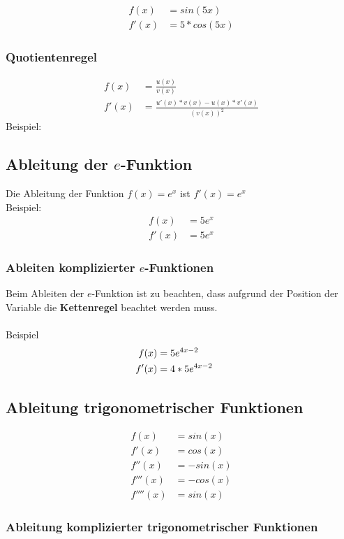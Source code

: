 \documentclass[a4paper]{article} %
\begin{document}
		\begin{align*}
		f(x)&=sin(5x)\\
		f'(x)&=5*cos(5x)
		\end{align*}

	\subsubsection{Quotientenregel}
		\begin{align*}
		f(x)&=\frac{u(x)}{v(x)}\\
		f'(x)&=\frac{u'(x)*v(x)-u(x)*v'(x)}{(v(x))^2}
		\end{align*}
		Beispiel: \\ 
	
	\subsection{Ableitung der $e$-Funktion}
	Die Ableitung der Funktion $f(x)=e^x$ ist $f'(x)=e^x$
	\\Beispiel:\\
	\begin{align*}
		f(x)&=5e^x\\
		f'(x)&=5e^x
	\end{align*}
	\subsubsection{Ableiten komplizierter $e$-Funktionen}
	Beim Ableiten der $e$-Funktion ist zu beachten, dass aufgrund der Position der Variable die \textbf{Kettenregel}
	beachtet werden muss.\\\\
	Beispiel
	\\\begin{align*}
	f(x)&=5e^{4x-2}\\
	f'(x) &=4*5e^{4x-2} \hspace{0.5cm} 
	\end{align*} 
	\subsection{Ableitung trigonometrischer Funktionen}
	\begin{align*}
	f(x) &= sin(x)\\
	f'(x) &= cos(x)\\
	f''(x) &= -sin(x)\\
	f'''(x) &= -cos(x)\\
	f''''(x) &= sin(x)
 	\end{align*}
 	\subsubsection{Ableitung komplizierter trigonometrischer Funktionen}
\end{document}
